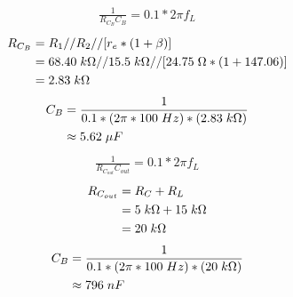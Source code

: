 \documentclass{article}
\begin{document}
	\begin{align*}
		\frac{1}{R_{C_B} C_B} = 0.1 * 2\pi f_L
	\end{align*}
	\begin{align*}
		R_{C_B} &= R_1 // R_2 // [r_e * (1 + \beta)]\\
		&= 68.40 \hspace{1mm} k\Omega // 15.5 \hspace{1mm} k\Omega // [24.75 \hspace{1mm} \Omega * (1 + 147.06)]\\
		&= 2.83 \hspace{1mm} k\Omega
	\end{align*}
	\begin{align*}
		C_B &= \frac{1}{0.1 * (2\pi * 100 \hspace{1mm} Hz) * (2.83 \hspace{1mm} k\Omega)}\\
		&\approx 5.62 \hspace{1mm} \mu F\\
	\end{align*}
	\pagebreak
	\begin{align*}
		\frac{1}{R_{C_{out}} C_{out}} = 0.1 * 2\pi f_L
	\end{align*}
	\begin{align*}
		R_{C_{out}} &= R_C + R_L\\
		&= 5 \hspace{1mm} k\Omega + 15 \hspace{1mm} k\Omega\\
		&= 20 \hspace{1mm} k\Omega
	\end{align*}
	\begin{align*}
		C_B &= \frac{1}{0.1 * (2\pi * 100 \hspace{1mm} Hz) * (20 \hspace{1mm} k\Omega)}\\
		&\approx 796 \hspace{1mm} nF\\
	\end{align*}
	
\end{document}
